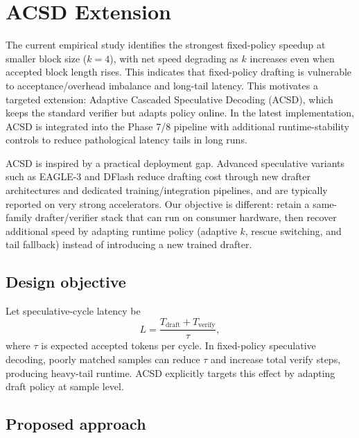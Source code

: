 \section{ACSD Extension}
\label{sec:acsd}

The current empirical study identifies the strongest fixed-policy speedup at
smaller block size ($k{=}4$), with net speed degrading as $k$ increases even
when accepted block length rises. This indicates that fixed-policy drafting is
vulnerable to acceptance/overhead imbalance and long-tail latency. This
motivates a targeted extension:
Adaptive Cascaded Speculative Decoding (ACSD), which keeps the standard
verifier but adapts policy online. In the latest implementation, ACSD is
integrated into the Phase 7/8 pipeline with additional runtime-stability
controls to reduce pathological latency tails in long runs.

ACSD is inspired by a practical deployment gap. Advanced speculative variants
such as EAGLE-3 and DFlash reduce drafting cost through new drafter
architectures and dedicated training/integration pipelines, and are typically
reported on very strong accelerators. Our objective is different: retain a
same-family drafter/verifier stack that can run on consumer hardware, then
recover additional speed by adapting runtime policy (adaptive $k$, rescue
switching, and tail fallback) instead of introducing a new trained drafter.

\subsection{Design objective}

Let speculative-cycle latency be
\begin{equation}
  L = \frac{T_{\text{draft}} + T_{\text{verify}}}{\tau},
\end{equation}
where $\tau$ is expected accepted tokens per cycle. In fixed-policy speculative
decoding, poorly matched samples can reduce $\tau$ and increase total verify
steps, producing heavy-tail runtime. ACSD explicitly targets this effect by
adapting draft policy at sample level.

\subsection{Proposed approach}

